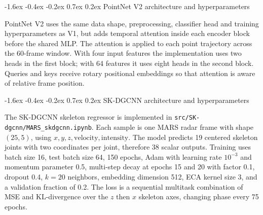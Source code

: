 \documentclass[10pt,twocolumn]{article}
\makeatletter
\renewcommand{\subsection}{%
  \@startsection{subsection}{2}{\z@}%
  {-1.6ex \@plus -0.4ex \@minus -0.2ex}%
  {0.7ex \@plus 0.2ex}%
  {\normalfont\normalsize\bfseries}}
\makeatother
\begin{document}
\subsection{PointNet V2 architecture and hyperparameters}

PointNet V2 uses the same data shape, preprocessing, classifier head and
training hyperparameters as V1, but adds temporal attention inside each encoder
block before the shared MLP. The attention is applied to each point trajectory
across the 60-frame window. With four input features the implementation uses
two heads in the first block; with 64 features it uses eight heads in the
second block. Queries and keys receive rotary positional embeddings so that
attention is aware of relative frame position.

\begin{table}[h]
\centering
\scriptsize
\setlength{\tabcolsep}{3pt}
\caption{PointNet V2 module layout.}
\label{tab:appendix-pointnet-v2}
\end{table}

\subsection{SK-DGCNN architecture and hyperparameters}

The SK-DGCNN skeleton regressor is implemented in
\texttt{src/SK-dgcnn/MARS\_skdgcnn.ipynb}. Each sample is one MARS radar frame
with shape $(25,5)$, using $x,y,z,\mathrm{velocity},\mathrm{intensity}$. The
model predicts 19 centered skeleton joints with two coordinates per joint,
therefore 38 scalar outputs. Training uses batch size 16, test batch size 64,
150 epochs, Adam with learning rate $10^{-3}$ and momentum parameter 0.5,
multi-step decay at epochs 15 and 20 with factor 0.1, dropout 0.4, $k=20$
neighbors, embedding dimension 512, ECA kernel size 3, and a validation
fraction of 0.2. The loss is a sequential multitask combination of MSE and
KL-divergence over the $z$ then $x$ skeleton axes, changing phase every
75 epochs.
\end{document}
